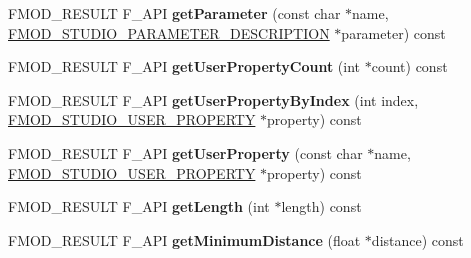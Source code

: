 \begin{DoxyCompactItemize}
\item 
\hypertarget{class_f_m_o_d_1_1_studio_1_1_event_description_ab3ca17faca50424a420b30562aedaff1}{F\+M\+O\+D\+\_\+\+R\+E\+S\+U\+L\+T F\+\_\+\+A\+P\+I {\bfseries get\+Parameter} (const char $\ast$name, \hyperlink{struct_f_m_o_d___s_t_u_d_i_o___p_a_r_a_m_e_t_e_r___d_e_s_c_r_i_p_t_i_o_n}{F\+M\+O\+D\+\_\+\+S\+T\+U\+D\+I\+O\+\_\+\+P\+A\+R\+A\+M\+E\+T\+E\+R\+\_\+\+D\+E\+S\+C\+R\+I\+P\+T\+I\+O\+N} $\ast$parameter) const }\label{class_f_m_o_d_1_1_studio_1_1_event_description_ab3ca17faca50424a420b30562aedaff1}

\item 
\hypertarget{class_f_m_o_d_1_1_studio_1_1_event_description_a49b615ff992c42bed77d3d300cf8712e}{F\+M\+O\+D\+\_\+\+R\+E\+S\+U\+L\+T F\+\_\+\+A\+P\+I {\bfseries get\+User\+Property\+Count} (int $\ast$count) const }\label{class_f_m_o_d_1_1_studio_1_1_event_description_a49b615ff992c42bed77d3d300cf8712e}

\item 
\hypertarget{class_f_m_o_d_1_1_studio_1_1_event_description_af19d8901f1d96d93c6cc48c235cfc895}{F\+M\+O\+D\+\_\+\+R\+E\+S\+U\+L\+T F\+\_\+\+A\+P\+I {\bfseries get\+User\+Property\+By\+Index} (int index, \hyperlink{struct_f_m_o_d___s_t_u_d_i_o___u_s_e_r___p_r_o_p_e_r_t_y}{F\+M\+O\+D\+\_\+\+S\+T\+U\+D\+I\+O\+\_\+\+U\+S\+E\+R\+\_\+\+P\+R\+O\+P\+E\+R\+T\+Y} $\ast$property) const }\label{class_f_m_o_d_1_1_studio_1_1_event_description_af19d8901f1d96d93c6cc48c235cfc895}

\item 
\hypertarget{class_f_m_o_d_1_1_studio_1_1_event_description_afcdd3e6b4b9413364d378db417294683}{F\+M\+O\+D\+\_\+\+R\+E\+S\+U\+L\+T F\+\_\+\+A\+P\+I {\bfseries get\+User\+Property} (const char $\ast$name, \hyperlink{struct_f_m_o_d___s_t_u_d_i_o___u_s_e_r___p_r_o_p_e_r_t_y}{F\+M\+O\+D\+\_\+\+S\+T\+U\+D\+I\+O\+\_\+\+U\+S\+E\+R\+\_\+\+P\+R\+O\+P\+E\+R\+T\+Y} $\ast$property) const }\label{class_f_m_o_d_1_1_studio_1_1_event_description_afcdd3e6b4b9413364d378db417294683}

\item 
\hypertarget{class_f_m_o_d_1_1_studio_1_1_event_description_a9a410a7525abe7e05047c28c29c43321}{F\+M\+O\+D\+\_\+\+R\+E\+S\+U\+L\+T F\+\_\+\+A\+P\+I {\bfseries get\+Length} (int $\ast$length) const }\label{class_f_m_o_d_1_1_studio_1_1_event_description_a9a410a7525abe7e05047c28c29c43321}

\item 
\hypertarget{class_f_m_o_d_1_1_studio_1_1_event_description_ab5f395eac9a873d8fb2adc84c014416e}{F\+M\+O\+D\+\_\+\+R\+E\+S\+U\+L\+T F\+\_\+\+A\+P\+I {\bfseries get\+Minimum\+Distance} (float $\ast$distance) const }\label{class_f_m_o_d_1_1_studio_1_1_event_description_ab5f395eac9a873d8fb2adc84c014416e}


\end{DoxyCompactItemize}
